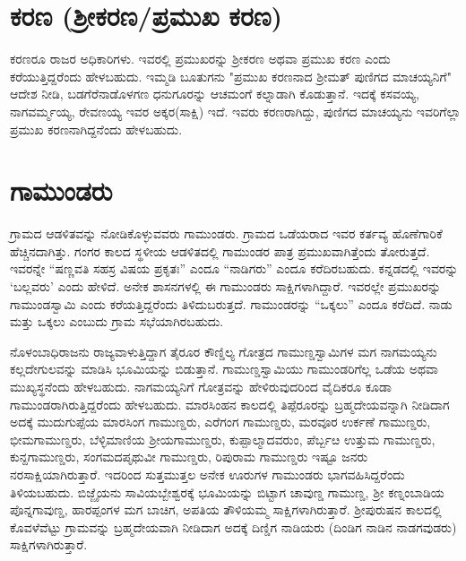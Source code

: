 \section{ಕರಣ (ಶ‍್ರೀಕರಣ/ಪ್ರಮುಖ ಕರಣ)}

ಕರಣರೂ ರಾಜರ ಅಧಿಕಾರಿಗಳು. ಇವರಲ್ಲಿ ಪ್ರಮುಖರನ್ನು ಶ‍್ರೀಕರಣ ಅಥವಾ ಪ್ರಮುಖ ಕರಣ ಎಂದು ಕರೆಯುತ್ತಿದ್ದರೆಂದು ಹೇಳಬಹುದು. ಇಮ್ಮಡಿ ಬೂತುಗನು "ಪ್ರಮುಖ ಕರಣನಾದ ಶ‍್ರೀಮತ್​ ಪುಣಿಗದ ಮಾಚಯ್ಯನಿಗೆ" ಆದೇಶ ನೀಡಿ, ಬಡಗೆರೆನಾಡೊಳಗಣ ಧನುಗೂರನ್ನು ಆಚಮಂಗೆ ಕಲ್ನಾಡಾಗಿ ಕೊಡುತ್ತಾನೆ. ಇದಕ್ಕೆ ಕಸವಯ್ಯ, ನಾಗವರ್ಮ್ಮಯ್ಯ, ರೇವಣಯ್ಯ ಇವರ ಅಕ್ಕರ(ಸಾಕ್ಷಿ) ಇದೆ. ಇವರು ಕರಣರಾಗಿದ್ದು, ಪುಣಿಗದ ಮಾಚಯ್ಯನು ಇವರಿಗೆಲ್ಲಾ ಪ್ರಮುಖ ಕರಣನಾಗಿದ್ದನೆಂದು ಹೇಳಬಹುದು.


\section{ಗಾಮುಂಡರು}

ಗ್ರಾಮದ ಆಡಳಿತವನ್ನು ನೋಡಿಕೊಳ್ಳುವವರು ಗಾಮುಂಡರು. ಗ್ರಾಮದ ಒಡೆಯರಾದ ಇವರ ಕರ್ತವ್ಯ ಹೊಣೆಗಾರಿಕೆ ಹೆಚ್ಚಿನದಾಗಿತ್ತು. ಗಂಗರ ಕಾಲದ ಸ್ಥಳೀಯ ಆಡಳಿತದಲ್ಲಿ ಗಾಮುಂಡರ ಪಾತ್ರ ಪ್ರಮುಖವಾಗಿತ್ತೆಂದು ತೋರುತ್ತದೆ. ಇವರನ್ನೇ “ಷಣ್ಣವತಿ ಸಹಸ್ರ ವಿಷಯ ಪ್ರಕೃತಃ” ಎಂದೂ “ನಾಡಿಗರು” ಎಂದೂ ಕರೆದಿರಬಹುದು. ಕನ್ನಡದಲ್ಲಿ ಇವರನ್ನು `ಬಲ್ಲವರು' ಎಂದು ಹೇಳಿದೆ. ಅನೇಕ ಶಾಸನಗಳಲ್ಲಿ ಈ ಗಾಮುಂಡರು ಸಾಕ್ಷಿಗಳಾಗಿದ್ದಾರೆ. ಇವರಲ್ಲೇ ಪ್ರಮುಖರನ್ನು ಗಾಮುಂಡಸ್ವಾಮಿ ಎಂದು ಕರೆಯತ್ತಿದ್ದರೆಂದು ತಿಳಿದುಬರುತ್ತದೆ. ಗಾಮುಂಡರನ್ನು “ಒಕ್ಕಲು” ಎಂದೂ ಕರೆದಿದೆ. ನಾಡು ಮತ್ತು ಒಕ್ಕಲು ಎಂಬುದು ಗ್ರಾಮ ಸಭೆಯಾಗಿರಬಹುದು.

ನೊಳಂಬಾಧಿರಾಜನು ರಾಜ್ಯವಾಳುತ್ತಿದ್ದಾಗ ತೈರೂರ ಕೌಣ್ಡಿಲ್ಯ ಗೋತ್ರದ ಗಾಮುಣ್ಡಸ್ವಾಮಿಗಳ ಮಗ ನಾಗಮಯ್ಯನು ಕಲ್ಲದೇಗುಲವನ್ನು ಮಾಡಿಸಿ ಭೂಮಿಯನ್ನು ಬಿಡುತ್ತಾನೆ. ಗಾಮುಣ್ಡಸ್ವಾಮಿಯು ಗಾಮುಂಡರಿಗೆಲ್ಲ ಒಡೆಯ ಅಥವಾ ಮುಖ್ಯಸ್ಥನೆಂದು ಹೇಳಬಹುದು. ನಾಗಮಯ್ಯನಿಗೆ ಗೋತ್ರವನ್ನು ಹೇಳಿರುವುದರಿಂದ ವೈದಿಕರೂ ಕೂಡಾ ಗಾಮುಂಡರಾಗಿರು\-ತ್ತಿದ್ದರೆಂದು ಹೇಳಬಹುದು. ಮಾರಸಿಂಹನ ಕಾಲದಲ್ಲಿ ತಿಪ್ಪೆರೂರನ್ನು ಬ್ರಹ್ಮದೇಯವನ್ನಾಗಿ ನೀಡಿದಾಗ ಅದಕ್ಕೆ ಮುದುಗುಪ್ಪೆಯ ಮಾರಸಿಂಗ ಗಾಮುಣ್ಡರು, ಎರೆಗಂಗ ಗಾಮುಣ್ಡರು, ಮರವೂರ ಉರ್ಕಣೆ ಗಾಮುಣ್ಡರು, ಭೀಮಗಾಮುಣ್ಡರು, ಬೆಳ್ಳಿಮಾಣಿಯ ಶ‍್ರೀಯಗಾಮುಣ್ಡರು, ಕುಪ್ಪಾಲ್ಮಾದವರುಂ, ಪೆರ್ಬ್ಬೞ ಉತ್ತುಮ ಗಾಮುಣ್ಡರು, ಕುನ್ದಗಾಮುಣ್ಡರು, ಸಂಗಮದ\break ಪೃಥುವೀ ಗಾಮುಣ್ಡರು, ರಿಪುರಾಮ ಗಾಮುಣ್ಡರು ಇಷ್ಟೂ ಜನರು ನರಸಾಕ್ಷಿಯಾಗಿರುತ್ತಾರೆ. ಇದರಿಂದ ಸುತ್ತಮುತ್ತಲ ಅನೇಕ ಊರುಗಳ ಗಾಮುಂಡರು ಭಾಗವಹಿಸಿದ್ದರೆಂದು ತಿಳಿಯಬಹುದು. ಬಿಜ್ಜೈಯನು ಸಾವಿಯಬ್ಬೇಶ್ವರಕ್ಕೆ ಭೂಮಿಯನ್ನು ಬಿಟ್ಟಾಗ ಚಾವುಣ್ಡ ಗಾಮುಣ್ಡ, ಶ‍್ರೀ ಕಣ್ನಂಬಾಡಿಯ ಪೊನ್ನಗಾವುಣ್ಡ, ಹಾರಪ್ಪಂಗಳ ಮಗ ಬಾಚಿಗ, ಅಪತಿಯ ತೌಳಿಯಮ್ಮ ಸಾಕ್ಷಿಗಳಾಗಿರುತ್ತಾರೆ. ಶ‍್ರೀಪುರುಷನ ಕಾಲದಲ್ಲಿ ಕೊವಳೆವೆಟ್ಟು ಗ್ರಾಮವನ್ನು ಬ್ರಹ್ಮದೇಯವಾಗಿ ನೀಡಿದಾಗ ಅದಕ್ಕೆ ದಿಣ್ಡಿಗ ನಾಡಿಯರು (ದಿಂಡಿಗ ನಾಡಿನ ನಾಡಗವುಡರು) ಸಾಕ್ಷಿಗಳಾಗಿರುತ್ತಾರೆ.

